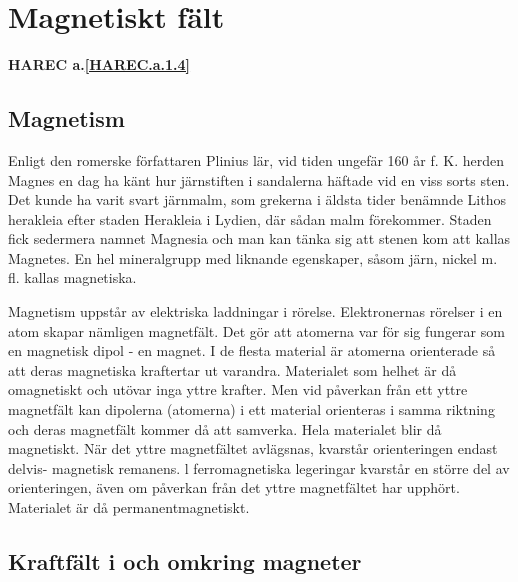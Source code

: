 \section{Magnetiskt fält}
\textbf{HAREC a.\ref{HAREC.a.1.4}\label{myHAREC.a.1.4}}

\subsection{Magnetism}

Enligt den romerske författaren Plinius lär, vid tiden ungefär 160 år f. K. herden Magnes
en dag ha känt hur järnstiften i sandalerna häftade vid en viss sorts sten. Det kunde ha
varit svart järnmalm, som grekerna i äldsta tider benämnde Lithos herakleia efter staden
Herakleia i Lydien, där sådan malm förekommer. Staden fick sedermera namnet Magnesia och
man kan tänka sig att stenen kom att kallas Magnetes. En hel mineralgrupp med liknande
egenskaper, såsom järn, nickel m. fl. kallas magnetiska.

Magnetism uppstår av elektriska laddningar i rörelse. Elektronernas rörelser i en atom
skapar nämligen magnetfält. Det gör att atomerna var för sig fungerar som en magnetisk
dipol - en magnet. I de flesta material är atomerna orienterade så att deras magnetiska
kraftertar ut varandra. Materialet som helhet är då omagnetiskt och utövar inga yttre
krafter. Men vid påverkan från ett yttre magnetfält kan dipolerna (atomerna) i ett
material orienteras i samma riktning och deras magnetfält kommer då att
samverka. Hela materialet blir då magnetiskt. När det yttre magnetfältet avlägsnas,
kvarstår orienteringen endast delvis- magnetisk remanens. l ferromagnetiska legeringar
kvarstår en större del av orienteringen, även om påverkan från det yttre magnetfältet har
upphört. Materialet är då permanentmagnetiskt.

\subsection{Kraftfält i och omkring magneter}

